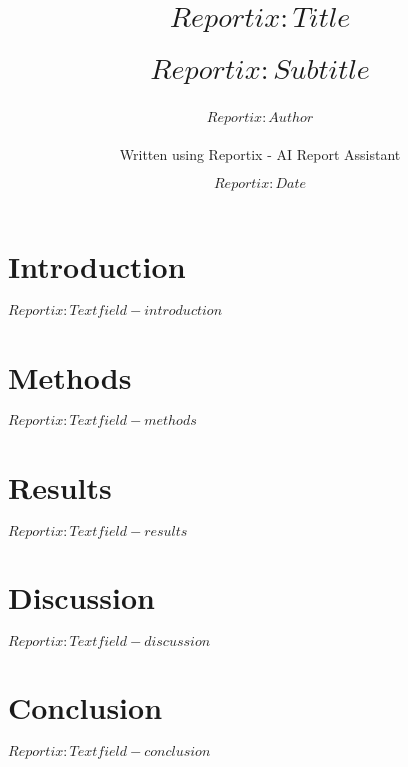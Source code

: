 \documentclass[12pt, a4paper, twocolumn]{article}
\title{
 $Reportix:Title$ \\
\begin{large}
  $Reportix:Subtitle$
\end{large} }
\author{
$Reportix:Author$ \\
\begin{small}
  Written using Reportix - AI Report Assistant
\end{small}
}
\date{$Reportix:Date$}
\begin{document}
\maketitle
\section*{Introduction}
$Reportix:Textfield-introduction$
\section*{Methods}
$Reportix:Textfield-methods$
\section*{Results}
$Reportix:Textfield-results$
\section*{Discussion}
$Reportix:Textfield-discussion$
\section*{Conclusion}
$Reportix:Textfield-conclusion$
\end{document}
